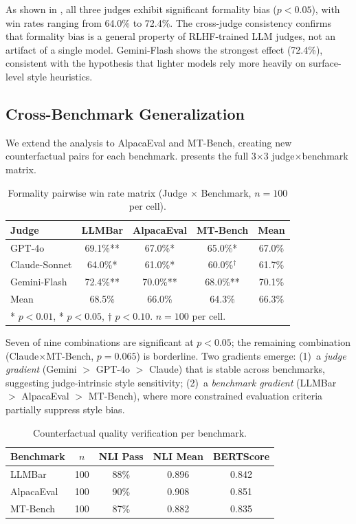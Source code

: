 \documentclass[11pt,a4paper]{article}
\begin{document}
As shown in , all three judges exhibit significant formality bias ($p < 0.05$), with win rates ranging from 64.0\% to 72.4\%.
The cross-judge consistency confirms that formality bias is a general property of RLHF-trained LLM judges, not an artifact of a single model.
Gemini-Flash shows the strongest effect (72.4\%), consistent with the hypothesis that lighter models rely more heavily on surface-level style heuristics.

\subsection{Cross-Benchmark Generalization}
\label{sec:crossbench}

We extend the analysis to AlpacaEval and MT-Bench, creating new counterfactual pairs for each benchmark.
 presents the full 3$\times$3 judge$\times$benchmark matrix.

\begin{table}[t]
\centering
\small
\caption{Formality pairwise win rate matrix (Judge $\times$ Benchmark, $n=100$ per cell).}
\label{tab:formality-matrix}
\begin{tabular}{lcccc}
\toprule
\textbf{Judge} & \textbf{LLMBar} & \textbf{AlpacaEval} & \textbf{MT-Bench} & \textbf{Mean} \\
\midrule
GPT-4o        & 69.1\%** & 67.0\%*  & 65.0\%*  & 67.0\% \\
Claude-Sonnet & 64.0\%*  & 61.0\%*  & 60.0\%$^\dagger$ & 61.7\% \\
Gemini-Flash  & 72.4\%** & 70.0\%** & 68.0\%** & 70.1\% \\
\midrule
Mean          & 68.5\%   & 66.0\%   & 64.3\%   & 66.3\% \\
\bottomrule
\multicolumn{5}{l}{\scriptsize ** $p<0.01$, * $p<0.05$, $\dagger$ $p<0.10$. $n=100$ per cell.}
\end{tabular}
\end{table}

Seven of nine combinations are significant at $p<0.05$; the remaining combination (Claude$\times$MT-Bench, $p=0.065$) is borderline.
Two gradients emerge: (1)~a \emph{judge gradient} (Gemini $>$ GPT-4o $>$ Claude) that is stable across benchmarks, suggesting judge-intrinsic style sensitivity; (2)~a \emph{benchmark gradient} (LLMBar $>$ AlpacaEval $>$ MT-Bench), where more constrained evaluation criteria partially suppress style bias.

\begin{table}[t]
\centering
\small
\caption{Counterfactual quality verification per benchmark.}
\label{tab:quality}
\begin{tabular}{lcccc}
\toprule
\textbf{Benchmark} & $n$ & \textbf{NLI Pass} & \textbf{NLI Mean} & \textbf{BERTScore} \\
\midrule
LLMBar     & 100 & 88\% & 0.896 & 0.842 \\
AlpacaEval & 100 & 90\% & 0.908 & 0.851 \\
MT-Bench   & 100 & 87\% & 0.882 & 0.835 \\
\bottomrule
\end{tabular}
\end{table}
\end{document}
